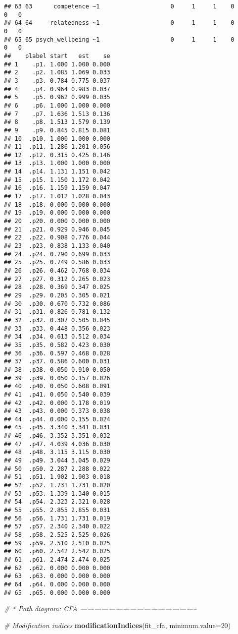 \documentclass[
]{article}
\newenvironment{Shaded}{\begin{snugshade}}{\end{snugshade}}
\newcommand{\CommentTok}[1]{\textcolor[rgb]{0.56,0.35,0.01}{\textit{#1}}}
\newcommand{\DataTypeTok}[1]{\textcolor[rgb]{0.13,0.29,0.53}{#1}}
\newcommand{\DecValTok}[1]{\textcolor[rgb]{0.00,0.00,0.81}{#1}}
\newcommand{\KeywordTok}[1]{\textcolor[rgb]{0.13,0.29,0.53}{\textbf{#1}}}
\newcommand{\NormalTok}[1]{#1}
\begin{document}
\begin{verbatim}
## 63 63      competence ~1                    0     1     1    0      0   0      
## 64 64     relatedness ~1                    0     1     1    0      0   0      
## 65 65 psych_wellbeing ~1                    0     1     1    0      0   0      
##    plabel start   est    se
## 1    .p1. 1.000 1.000 0.000
## 2    .p2. 1.085 1.069 0.033
## 3    .p3. 0.784 0.775 0.037
## 4    .p4. 0.964 0.983 0.037
## 5    .p5. 0.962 0.999 0.035
## 6    .p6. 1.000 1.000 0.000
## 7    .p7. 1.636 1.513 0.136
## 8    .p8. 1.513 1.579 0.139
## 9    .p9. 0.845 0.815 0.081
## 10  .p10. 1.000 1.000 0.000
## 11  .p11. 1.286 1.201 0.056
## 12  .p12. 0.315 0.425 0.146
## 13  .p13. 1.000 1.000 0.000
## 14  .p14. 1.131 1.151 0.042
## 15  .p15. 1.150 1.172 0.042
## 16  .p16. 1.159 1.159 0.047
## 17  .p17. 1.012 1.028 0.043
## 18  .p18. 0.000 0.000 0.000
## 19  .p19. 0.000 0.000 0.000
## 20  .p20. 0.000 0.000 0.000
## 21  .p21. 0.929 0.946 0.045
## 22  .p22. 0.908 0.776 0.044
## 23  .p23. 0.838 1.133 0.040
## 24  .p24. 0.790 0.699 0.033
## 25  .p25. 0.749 0.586 0.033
## 26  .p26. 0.462 0.768 0.034
## 27  .p27. 0.312 0.265 0.023
## 28  .p28. 0.369 0.347 0.025
## 29  .p29. 0.205 0.305 0.021
## 30  .p30. 0.670 0.732 0.086
## 31  .p31. 0.826 0.781 0.132
## 32  .p32. 0.307 0.505 0.045
## 33  .p33. 0.448 0.356 0.023
## 34  .p34. 0.613 0.512 0.034
## 35  .p35. 0.582 0.423 0.030
## 36  .p36. 0.597 0.468 0.028
## 37  .p37. 0.586 0.600 0.031
## 38  .p38. 0.050 0.910 0.050
## 39  .p39. 0.050 0.157 0.026
## 40  .p40. 0.050 0.608 0.091
## 41  .p41. 0.050 0.540 0.039
## 42  .p42. 0.000 0.178 0.019
## 43  .p43. 0.000 0.373 0.038
## 44  .p44. 0.000 0.155 0.024
## 45  .p45. 3.340 3.341 0.031
## 46  .p46. 3.352 3.351 0.032
## 47  .p47. 4.039 4.036 0.030
## 48  .p48. 3.115 3.115 0.030
## 49  .p49. 3.044 3.045 0.029
## 50  .p50. 2.287 2.288 0.022
## 51  .p51. 1.902 1.903 0.018
## 52  .p52. 1.731 1.731 0.020
## 53  .p53. 1.339 1.340 0.015
## 54  .p54. 2.323 2.321 0.028
## 55  .p55. 2.855 2.855 0.031
## 56  .p56. 1.731 1.731 0.019
## 57  .p57. 2.340 2.340 0.022
## 58  .p58. 2.525 2.525 0.026
## 59  .p59. 2.510 2.510 0.025
## 60  .p60. 2.542 2.542 0.025
## 61  .p61. 2.474 2.474 0.025
## 62  .p62. 0.000 0.000 0.000
## 63  .p63. 0.000 0.000 0.000
## 64  .p64. 0.000 0.000 0.000
## 65  .p65. 0.000 0.000 0.000
\end{verbatim}

\begin{Shaded}
\begin{Highlighting}[]
\CommentTok{# * Path diagram: CFA --------------------------------------------------}

\CommentTok{# Modification indices}
\KeywordTok{modificationIndices}\NormalTok{(fit_cfa, }\DataTypeTok{minimum.value=}\DecValTok{20}\NormalTok{)}
\end{Highlighting}
\end{Shaded}
\end{document}
